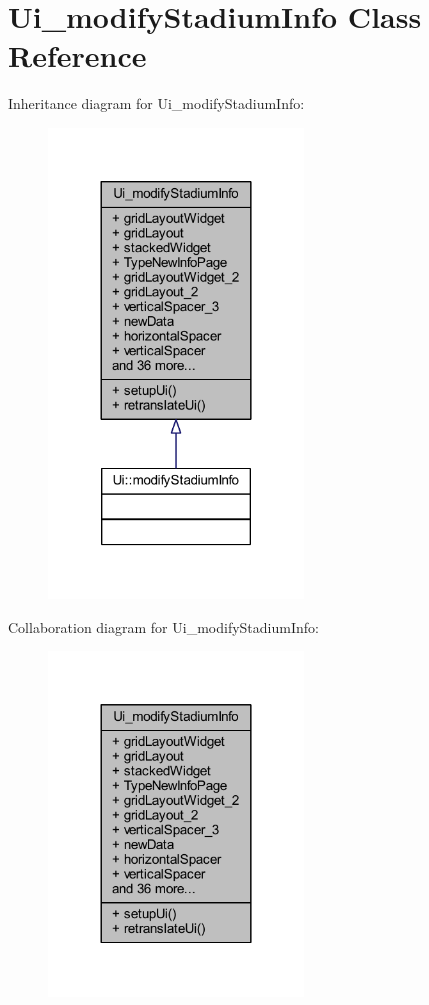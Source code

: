 \hypertarget{class_ui__modify_stadium_info}{}\section{Ui\+\_\+modify\+Stadium\+Info Class Reference}
\label{class_ui__modify_stadium_info}


Inheritance diagram for Ui\+\_\+modify\+Stadium\+Info\+:\nopagebreak
\begin{figure}[H]
\begin{center}
\leavevmode
\includegraphics[width=192pt]{class_ui__modify_stadium_info__inherit__graph}
\end{center}
\end{figure}


Collaboration diagram for Ui\+\_\+modify\+Stadium\+Info\+:\nopagebreak
\begin{figure}[H]
\begin{center}
\leavevmode
\includegraphics[width=192pt]{class_ui__modify_stadium_info__coll__graph}
\end{center}
\end{figure}
